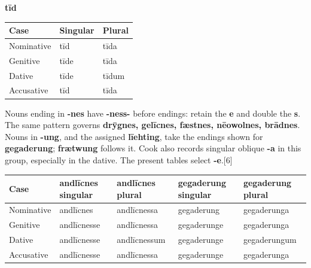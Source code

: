 \textbf{tīd}\par\nobreak

\par\begingroup
\fontsize{10.5}{13.2}\selectfont
\setlength{\LTleft}{0pt}\setlength{\LTright}{\fill}
\noindent
\begin{tabular}{@{}>{\raggedright\arraybackslash}p{39.459mm}>{\raggedright\arraybackslash}p{39.459mm}>{\raggedright\arraybackslash}p{39.459mm}@{}}
\toprule
\textbf{Case} & \textbf{Singular} & \textbf{Plural} \\
\midrule
Nominative & tīd & tīda \\
Genitive & tīde & tīda \\
Dative & tīde & tīdum \\
Accusative & tīd & tīda \\
\bottomrule
\end{tabular}
\par\endgroup

Nouns ending in \textbf{-nes} have \textbf{-ness-} before endings: retain the \textbf{e} and double the \textbf{s}. The same pattern governs \textbf{drȳgnes, gelīcnes, fæstnes, nēowolnes, brādnes}. Nouns in \textbf{-ung}, and the assigned \textbf{līehting}, take the endings shown for \textbf{gegaderung}; \textbf{frætwung} follows it. Cook also records singular oblique \textbf{-a} in this group, especially in the dative. The present tables select \textbf{-e}.[6]

\par\begingroup
\fontsize{10.5}{13.2}\selectfont
\setlength{\LTleft}{0pt}\setlength{\LTright}{\fill}
\noindent
\begin{tabular}{@{}>{\raggedright\arraybackslash}p{19.0mm}>{\raggedright\arraybackslash}p{23.0mm}>{\raggedright\arraybackslash}p{23.0mm}>{\raggedright\arraybackslash}p{23.0mm}>{\raggedright\arraybackslash}p{24.752mm}@{}}
\toprule
\textbf{Case} & \textbf{andlīcnes singular} & \textbf{andlīcnes plural} & \textbf{gegaderung singular} & \textbf{gegaderung plural} \\
\midrule
Nominative & andlīcnes & andlīcnessa & gegaderung & gegaderunga \\
Genitive & andlīcnesse & andlīcnessa & gegaderunge & gegaderunga \\
Dative & andlīcnesse & andlīcnessum & gegaderunge & gegaderungum \\
Accusative & andlīcnesse & andlīcnessa & gegaderunge & gegaderunga \\
\bottomrule
\end{tabular}
\par\endgroup

